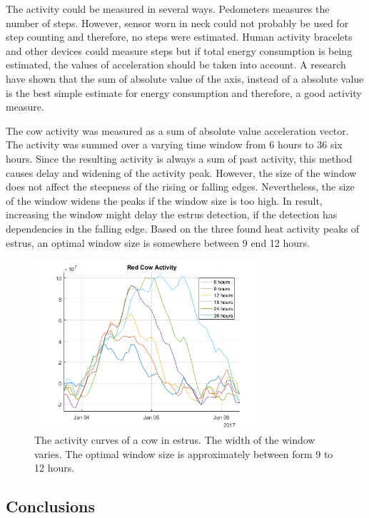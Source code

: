\documentclass[english,12pt,a4paper,pdftex,elec,utf8]{aaltothesis}
\begin{document}
The activity could be measured in several ways. Pedometers measures the number of steps. However, sensor worn in neck could not probably be used for step counting and therefore, no steps were estimated. Human activity bracelets and other devices could measure steps but if total energy consumption is being estimated, the values of acceleration should be taken into account. A research have shown that the sum of absolute value of the axis, instead of a absolute value is the best simple estimate for energy consumption and therefore, a good activity measure.

The cow activity was measured as a sum of absolute value acceleration vector. The activity was summed over a varying time window from 6 hours to 36 six hours. Since the resulting activity is always a sum of past activity, this method causes delay and widening of the activity peak. However, the size of the window does not affect the steepness of the rising or falling edges. Nevertheless, the size of the window widens the peaks if the window size is too high. In result, increasing the window might delay the estrus detection, if the detection has dependencies in the falling edge. Based on the three found heat activity peaks of estrus, an optimal window size is somewhere between 9 end 12 hours.

\begin{figure}[htb]
\centering
\includegraphics[width = 0.75\textwidth]{figures/redcowactivity2.png}
\caption{The activity curves of a cow in estrus. The width of the window varies. The optimal window size is approximately between form 9 to 12 hours.}
\end{figure}

\subsection{Conclusions} \label{conclusionssection}
\end{document}
